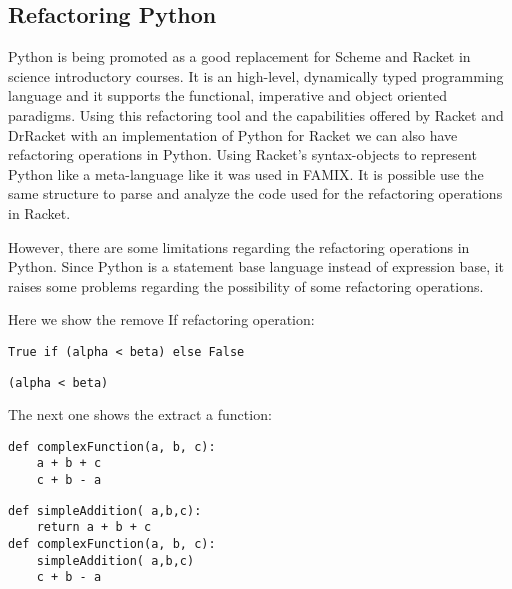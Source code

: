 \subsection{Refactoring Python}
Python is being promoted as a good replacement for Scheme and Racket in science introductory courses.
It is an high-level, dynamically typed programming language and it supports the functional, imperative and object
oriented paradigms.
Using this refactoring tool and the capabilities offered by Racket and DrRacket with an implementation of Python for Racket\cite{ramos2014implementation} \cite{ramos2014reaching}
we can also have refactoring operations in Python.
Using Racket's syntax-objects to represent Python like a meta-language like it was used in FAMIX\cite{tichelaar2000meta}.
It is possible use the same structure to parse and analyze the code used for the refactoring operations in Racket.

However, there are some limitations regarding the refactoring operations in Python.
Since Python is a statement base language instead of expression base, it raises
some problems regarding the possibility of some refactoring operations.


Here we show the remove If refactoring operation:
\lstset{style=python}
\begin{lstlisting}
True if (alpha < beta) else False
\end{lstlisting}

\begin{lstlisting}
(alpha < beta)
\end{lstlisting}

The next one shows the extract a function:
\begin{lstlisting}
def complexFunction(a, b, c):
    a + b + c
    c + b - a
\end{lstlisting}

\begin{lstlisting}
def simpleAddition( a,b,c):
    return a + b + c
def complexFunction(a, b, c):
    simpleAddition( a,b,c)
    c + b - a
\end{lstlisting}
